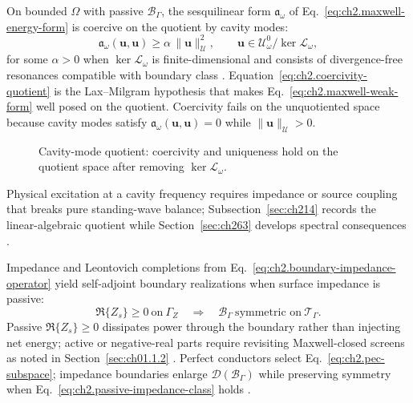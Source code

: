 On bounded \(\Omega\) with passive \(\mathcal{B}_\Gamma\), the sesquilinear form \(\mathfrak{a}_\omega\) of Eq.~\eqref{eq:ch2.maxwell-energy-form} is coercive on the quotient by cavity modes:
\begin{equation}
\label{eq:ch2.coercivity-quotient}
\mathfrak{a}_\omega(\mathbf{u},\mathbf{u})
\ge
\alpha\,\|\mathbf{u}\|_{\mathcal{U}}^{2},
\qquad
\mathbf{u}\in\mathcal{U}_\omega^{0}/\ker\mathcal{L}_\omega,
\end{equation}
for some \(\alpha>0\) when \(\ker\mathcal{L}_\omega\) is finite-dimensional and consists of divergence-free resonances compatible with boundary class \cite{stratton1941}. Equation~\eqref{eq:ch2.coercivity-quotient} is the Lax--Milgram hypothesis that makes Eq.~\eqref{eq:ch2.maxwell-weak-form} well posed on the quotient. Coercivity fails on the unquotiented space because cavity modes satisfy \(\mathfrak{a}_\omega(\mathbf{u},\mathbf{u})=0\) while \(\|\mathbf{u}\|_{\mathcal{U}}>0\).
\begin{figure}[t]
\centering
{}
\caption{Cavity-mode quotient: coercivity and uniqueness hold on the quotient space after removing \(\ker\mathcal{L}_\omega\).}
\label{fig:ch2.cavity-quotient-schematic}
\end{figure}
Physical excitation at a cavity frequency requires impedance or source coupling that breaks pure standing-wave balance; Subsection~\ref{sec:ch214} records the linear-algebraic quotient while Section~\ref{sec:ch263} develops spectral consequences \cite{stratton1941}.

Impedance and Leontovich completions from Eq.~\eqref{eq:ch2.boundary-impedance-operator} yield self-adjoint boundary realizations when surface impedance is passive:
\begin{equation}
\label{eq:ch2.passive-impedance-class}
\Re\{Z_s\}\ge 0\ \text{on}\ \Gamma_Z
\quad\Longrightarrow\quad
\mathcal{B}_\Gamma\ \text{symmetric on}\ \mathcal{T}_\Gamma.
\end{equation}
Passive \(\Re\{Z_s\}\ge 0\) dissipates power through the boundary rather than injecting net energy; active or negative-real parts require revisiting Maxwell-closed screens as noted in Section~\ref{sec:ch01.1.2} \cite{stratton1941}. Perfect conductors select Eq.~\eqref{eq:ch2.pec-subspace}; impedance boundaries enlarge \(\mathcal{D}(\mathcal{B}_\Gamma)\) while preserving symmetry when Eq.~\eqref{eq:ch2.passive-impedance-class} holds \cite{harrington2001}.

